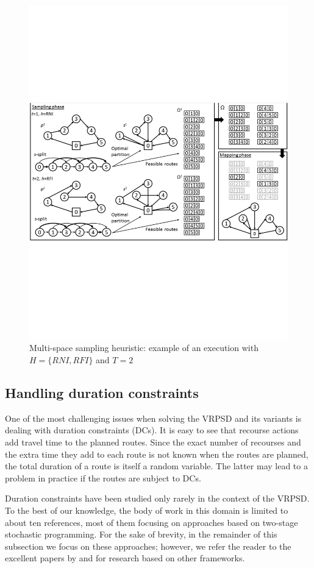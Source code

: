 \begin{figure}
\begin{center}
\includegraphics[width=12cm,clip=true]{./img/f_vrpsd_msh}
\caption{Multi-space sampling heuristic: example of an execution with $H=\{RNI,RFI\}$ and $T=2$}\label{FigExample}
\end{center}
\end{figure}

\subsection{Handling duration constraints}\label{s.vrpsd-dc}
One of the most challenging issues when solving the VRPSD and its variants is dealing with duration constraints (DCs). It is easy to see that recourse actions add travel time to the planned routes. Since the exact number of recourses and the extra time they add to each route is not known when the routes are planned, the total duration of a route is itself a random variable. The latter may lead to a problem in practice if the routes are subject to DCs.

Duration constraints have been studied only rarely in the context of the VRPSD. To the best of our knowledge, the body of work in this domain is limited to about ten references, most of them focusing on approaches based on two-stage stochastic programming. For the sake of brevity, in the remainder of this subsection we focus on these approaches; however, we refer the reader to the excellent papers by \citet{Bent2004,Bent2007} and \citet{Goodson2013,Goodson2013a} for research based on other frameworks.

